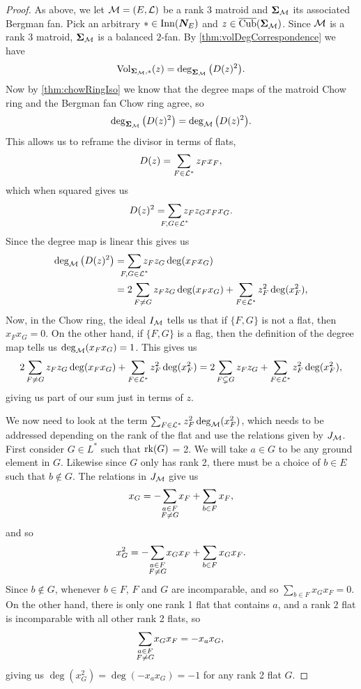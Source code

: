 \documentclass[12pt,oneside]{../../sfsuthesis}
\begin{document}
\begin{proof}
    As above, we let \( \mathcal{M}=(E,\mathcal{L}) \) be a rank 3 matroid and \( {\bm{\Sigma}}_{\mathcal{M}}  \) its associated Bergman fan.
    Pick an arbitrary \( \ast \in \mathrm{Inn}(\bm{N}_E) \) and \( z \in \operatorname{\overline{Cub}}({\bm{\Sigma}}_{\mathcal{M}}) \).
    Since \( \mathcal{M} \) is a rank \( 3 \) matroid,  \( {\bm{\Sigma}}_{\mathcal{M}}  \) is a balanced \( 2 \)-fan.
    By \th\ref{thm:volDegCorrespondence} we have
    \[
        \operatorname{Vol}_{{\bm{\Sigma}}_{\mathcal{M}}, \ast}(z) = \deg_{{\bm{\Sigma}}_{\mathcal{M}}}\big( D(z)^2 \big).
    \]
    Now by \th\ref{thm:chowRingIso} we know that the degree maps of the matroid Chow ring and the Bergman fan Chow ring agree, so
    \[
        \deg_{{\bm{\Sigma}}_{\mathcal{M}}}\big( D(z)^2 \big) = \deg_{\mathcal{M}}\big( D(z)^2 \big).
    \]
    This allows us to reframe the divisor in terms of flats,
    \[
        D(z) = \sum_{F \in \mathcal{L}^\ast} z_F x_F,
    \]
    which when squared gives us
    \[
        D(z)^2 = \sum_{\mathclap{F, G \in \cL^\ast}} z_F z_{G} x_F x_{G}.
    \]
    Since the degree map is linear this gives us
    \begin{align*}
        \deg_{\cM}\big( D(z)^2 \big) & =  \sum_{\mathclap{F, G \in \cL^\ast}} z_F z_{G} \deg(x_F x_{G})                         \\
                                     & = 2 \sum_{F \neq G} z_F z_{G} \deg(x_F x_{G}) + \sum_{F \in \cL^\ast} z_F^2 \deg(x_F^2),
    \end{align*}
    Now, in the Chow ring, the ideal \( I_{\mathcal{M}} \) tells us that if \( \{ F, G \} \) is not a flat, then \( x_F x_G = 0 \).
    On the other hand, if \( \{ F, G \} \) is a flag, then the definition of the degree map tells us \( \deg_{\mathcal{M}}(x_F x_G) = 1 \).
    This gives us
    \[
        2 \sum_{F \neq G} z_F z_{G} \deg(x_F x_{G}) + \sum_{F \in \mathcal{L}^\ast} z_F^2 \deg(x_F^2)
        = 2 \sum_{F \subsetneq G} z_F z_{G} + \sum_{F \in \mathcal{L}^\ast} z_F^2 \deg(x_F^2),
    \]
    giving us part of our sum just in terms of \( z \).

    We now need to look at the term \(  \sum_{F \in \mathcal{L}^\ast} z_F^2 \deg_{\mathcal{M}}(x_F^2) \), which needs to be addressed depending on the rank of the flat and use the relations given by \( J_{\mathcal{M}} \).
    First consider \( G \in L^\ast \) such that \( \operatorname{rk}(G) \) = 2.
    We will take \( a \in G \) to be any ground element in \( G \).
    Likewise since \( G \) only has rank 2, there must be a choice of \( b \in E \) such that \( b \notin G \).
    The relations in \( J_{\mathcal{M}} \) give us
    \[
        x_G = - \sum_{\mathclap{\substack{a \in F \\ F \neq G}}}x_F + \sum_{b \in F} x_F,
    \]
    and so
    \[
        x_G^2 = - \sum_{\mathclap{\substack{a \in F \\ F \neq G}}}x_G x_F + \sum_{b \in F} x_G x_F.
    \]
    Since \( b \notin G \), whenever \( b \in F \), \( F \) and \( G \) are incomparable, and so \( \sum_{b \in F} x_G x_F = 0 \).
    On the other hand, there is only one rank 1 flat that contains \( a \),  and a rank \( 2 \) flat is incomparable with all other rank 2 flats, so
    \[
        \sum_{\mathclap{\substack{a \in F \\ F \neq G}}}x_G x_F = -x_a x_G,
    \]
    giving us \( \deg(x_G^2) = \deg(-x_a x_G) = -1 \) for any rank 2 flat \( G \).


\end{proof}
\end{document}
